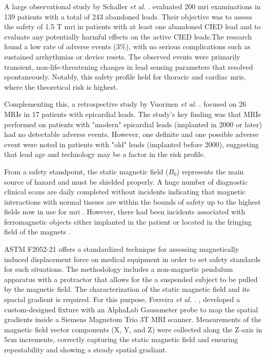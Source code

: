 

A large observational study by Schaller \textit{et al.} . \cite{schaller2021} evaluated 200 \gls{mri} examinations in 139 patients with a total of 243 abandoned leads. Their objective was to assess the safety of 1.5 T \gls{mri} in patients with at least one abandoned CIED lead and to evaluate any potentially harmful effects on the active CIED leads.The research found a low rate of adverse events (3\%), with no serious complications such as sustained arrhythmias or device resets. The observed events were primarily transient, non-life-threatening changes in lead sensing parameters that resolved spontaneously. Notably, this safety profile held for thoracic and cardiac \gls{mri}s, where the theoretical risk is highest.

Complementing this, a retrospective study by Vuorinen \textit{et al.} . \cite{vuorinen2021} focused on 26 MRIs in 17 patients with epicardial leads. The study's key finding was that MRIs performed on patients with "modern" epicardial leads (implanted in 2000 or later) had no detectable adverse events. However, one definite and one possible adverse event were noted in patients with "old" leads (implanted before 2000), suggesting that lead age and technology may be a factor in the risk profile.

From a safety standpoint, the static magnetic field ($B_0$) represents the main source of hazard and must be shielded properly. A huge number of diagnostic clinical scans are daily completed without incidents indicating that magnetic interactions with normal tissues are within the bounds of safety up to the highest fields now in use for \gls{mri} \cite{Schenck2000}.  However, there had been incidents associated with ferromagnetic objects either implanted in the patient or located in the fringing field of the magnets \cite{Delnoa2019,Sawyer2024}.

ASTM F2052-21 \cite{astmF2052} offers a standardized technique for assessing magnetically induced displacement force on medical equipment in order to set safety standards for such situations. The methodology includes a non-magnetic pendulum apparatus with a protractor that allows for the a suspended subject to be pulled by the magnetic field. The characterization of the static magnetic field and its spacial gradient is required. For this purpose, Ferreira \textit{et al.} . \cite{ferreira2017}, developed a custom-designed fixture with an AlphaLab Gaussmeter probe to map the spatial gradients inside a Siemens Magnetom Trio 3T MRI scanner. Measurements of the magnetic field vector components (X, Y, and Z) were collected along the Z-axis in 5cm increments, correctly capturing the static magnetic field and ensuring repeatability and showing a steady spatial gradiant. 

